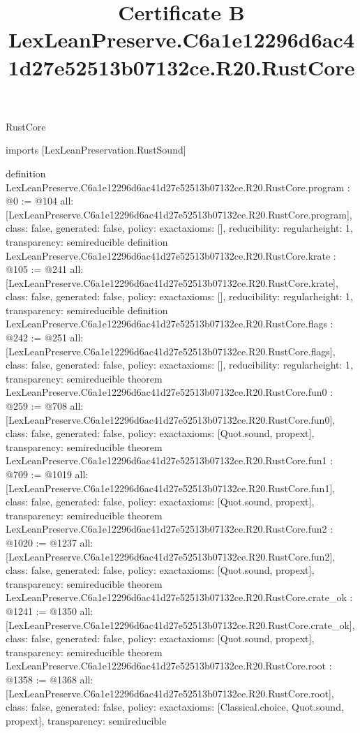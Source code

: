 \begin{lexlean}{RustCore}
\title{Certificate B LexLeanPreserve.C6a1e12296d6ac41d27e52513b07132ce.R20.RustCore}
\begin{coremodule}
imports [LexLeanPreservation.RustSound]

definition LexLeanPreserve.C6a1e12296d6ac41d27e52513b07132ce.R20.RustCore.program : @0 := @104 {
  all: [LexLeanPreserve.C6a1e12296d6ac41d27e52513b07132ce.R20.RustCore.program],
  class: false,
  generated: false,
  policy: exact{axioms: []},
  reducibility: regular{height: 1},
  transparency: semireducible
}
definition LexLeanPreserve.C6a1e12296d6ac41d27e52513b07132ce.R20.RustCore.krate : @105 := @241 {
  all: [LexLeanPreserve.C6a1e12296d6ac41d27e52513b07132ce.R20.RustCore.krate],
  class: false,
  generated: false,
  policy: exact{axioms: []},
  reducibility: regular{height: 1},
  transparency: semireducible
}
definition LexLeanPreserve.C6a1e12296d6ac41d27e52513b07132ce.R20.RustCore.flags : @242 := @251 {
  all: [LexLeanPreserve.C6a1e12296d6ac41d27e52513b07132ce.R20.RustCore.flags],
  class: false,
  generated: false,
  policy: exact{axioms: []},
  reducibility: regular{height: 1},
  transparency: semireducible
}
theorem LexLeanPreserve.C6a1e12296d6ac41d27e52513b07132ce.R20.RustCore.fun0 : @259 := @708 {
  all: [LexLeanPreserve.C6a1e12296d6ac41d27e52513b07132ce.R20.RustCore.fun0],
  class: false,
  generated: false,
  policy: exact{axioms: [Quot.sound, propext]},
  transparency: semireducible
}
theorem LexLeanPreserve.C6a1e12296d6ac41d27e52513b07132ce.R20.RustCore.fun1 : @709 := @1019 {
  all: [LexLeanPreserve.C6a1e12296d6ac41d27e52513b07132ce.R20.RustCore.fun1],
  class: false,
  generated: false,
  policy: exact{axioms: [Quot.sound, propext]},
  transparency: semireducible
}
theorem LexLeanPreserve.C6a1e12296d6ac41d27e52513b07132ce.R20.RustCore.fun2 : @1020 := @1237 {
  all: [LexLeanPreserve.C6a1e12296d6ac41d27e52513b07132ce.R20.RustCore.fun2],
  class: false,
  generated: false,
  policy: exact{axioms: [Quot.sound, propext]},
  transparency: semireducible
}
theorem LexLeanPreserve.C6a1e12296d6ac41d27e52513b07132ce.R20.RustCore.crate_ok : @1241 := @1350 {
  all: [LexLeanPreserve.C6a1e12296d6ac41d27e52513b07132ce.R20.RustCore.crate_ok],
  class: false,
  generated: false,
  policy: exact{axioms: [Quot.sound, propext]},
  transparency: semireducible
}
theorem LexLeanPreserve.C6a1e12296d6ac41d27e52513b07132ce.R20.RustCore.root : @1358 := @1368 {
  all: [LexLeanPreserve.C6a1e12296d6ac41d27e52513b07132ce.R20.RustCore.root],
  class: false,
  generated: false,
  policy: exact{axioms: [Classical.choice, Quot.sound, propext]},
  transparency: semireducible
}


\end{coremodule}
\end{lexlean}
